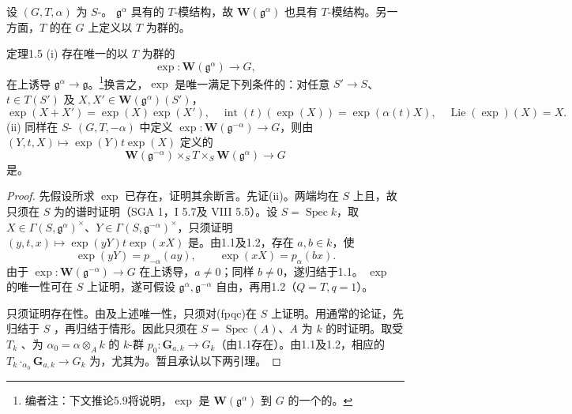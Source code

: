 设 $(G,T,\alpha)$ 为 $S$-。 $\mathfrak g^\alpha$ 具有的 $T$-模结构，故 $\mathbf W(\mathfrak g^\alpha)$ 也具有 $T$-模结构。另一方面，$T$ 的在 $G$ 上定义以 $T$ 为群的。
\begin{SGAresult}{定理}{1.5}
(i) 存在唯一的以 $T$ 为群的
\[\exp:\mathbf W(\mathfrak g^\alpha)\longrightarrow G,\]
在上诱导 $\mathfrak g^\alpha\to\mathfrak g$。\footnote{编者注：下文推论5.9将说明，$\exp$ 是 $\mathbf W(\mathfrak g^\alpha)$ 到 $G$ 的一个的。}换言之，$\exp$ 是唯一满足下列条件的：对任意 $S'\to S$、$t\in T(S')$ 及 $X,X'\in\mathbf W(\mathfrak g^\alpha)(S')$，
\[\exp(X+X')=\exp(X)\exp(X'),\quad \operatorname{int}(t)(\exp(X))=\exp(\alpha(t)X),\quad\operatorname{Lie}(\exp)(X)=X.\]
(ii) 同样在 $S$- $(G,T,-\alpha)$ 中定义 $\exp:\mathbf W(\mathfrak g^{-\alpha})\to G$，则由 $(Y,t,X)\mapsto\exp(Y)t\exp(X)$ 定义的
\[\mathbf W(\mathfrak g^{-\alpha})\times_S T\times_S\mathbf W(\mathfrak g^\alpha)\longrightarrow G\]
是。
\end{SGAresult}
\begin{proof}
先假设所求 $\exp$ 已存在，证明其余断言。先证(ii)。两端均在 $S$ 上且，故只须在 $S$ 为的谱时证明（SGA 1，I 5.7及 VIII 5.5）。设 $S=\operatorname{Spec}k$，取 $X\in\Gamma(S,\mathfrak g^\alpha)^\times$、$Y\in\Gamma(S,\mathfrak g^{-\alpha})^\times$，只须证明 $(y,t,x)\mapsto\exp(yY)t\exp(xX)$ 是。由1.1及1.2，存在 $a,b\in k$，使
\[\exp(yY)=p_{-\alpha}(ay),\qquad\exp(xX)=p_\alpha(bx).\]
由于 $\exp:\mathbf W(\mathfrak g^{-\alpha})\to G$ 在上诱导，$a\ne0$；同样 $b\ne0$，遂归结于1.1。
$\exp$ 的唯一性可在 $S$ 上证明，遂可假设 $\mathfrak g^\alpha,\mathfrak g^{-\alpha}$ 自由，再用1.2（$Q=T,q=1$）。

只须证明存在性。由及上述唯一性，只须对(fpqc)在 $S$ 上证明。用通常的论证，先归结于 $S$ ，再归结于情形。因此只须在 $S=\operatorname{Spec}(A)$、$A$ 为 $k$ 的时证明。取受 $T_k$ 、为 $\alpha_0=\alpha\otimes_Ak$ 的 $k$-群 $p_0:\mathbf G_{a,k}\to G_k$（由1.1存在）。由1.1及1.2，相应的 $T_k\mathbin{\cdot}_{\alpha_0}\mathbf G_{a,k}\to G_k$ 为，尤其为。暂且承认以下两引理。
\end{proof}
